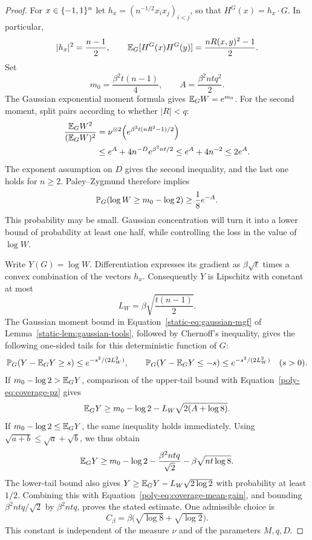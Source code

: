 \begin{proof}
For $x\in\{-1,1\}^n$ let $h_x=(n^{-1/2}x_ix_j)_{i<j}$, so that
$H^G(x)=h_x\cdot G$. In particular,
\[
 |h_x|^2=\frac{n-1}{2},\qquad
 \mathbb E_G[H^G(x)H^G(y)]=\frac{nR(x,y)^2-1}{2}.
\]
Set
\[
 m_0=\frac{\beta^2t(n-1)}4,\qquad
 A=\frac{\beta^2ntq^2}{2}.
\]
The Gaussian exponential moment formula gives $\mathbb E_GW=e^{m_0}$.
For the second moment, split pairs according to whether $|R|<q$:
\begin{align}
 \frac{\mathbb E_GW^2}{(\mathbb E_GW)^2}
 &=\nu^{\otimes2}\!\left(e^{\beta^2t(nR^2-1)/2}\right)\notag\\
 &\le e^A+4n^{-D}e^{\beta^2nt/2}
 \le e^A+4n^{-2}
 \le2e^A.
 \label{poly-eq:coverage-moments}
\end{align}
The exponent assumption on $D$ gives the second inequality, and the last
one holds for $n\ge2$. Paley--Zygmund therefore implies
\begin{equation}\label{poly-eq:coverage-pz}
 \mathbb P_G(\log W\ge m_0-\log2)\ge\frac18e^{-A}.
\end{equation}
This probability may be small. Gaussian concentration will turn it into
a lower bound of probability at least one half, while controlling the loss
in the value of $\log W$.

Write $Y(G)=\log W$. Differentiation expresses its gradient as
$\beta\sqrt t$ times a convex combination of the vectors $h_x$.
Consequently $Y$ is Lipschitz with constant at most
\[
 L_W=\beta\sqrt{\frac{t(n-1)}2}.
\]
The Gaussian moment bound in Equation~\eqref{static-eq:gaussian-mgf}
of Lemma~\ref{static-lem:gaussian-tools}, followed by Chernoff's inequality,
gives the following one-sided tails for this deterministic function of $G$:
\[
 \mathbb P_G(Y-\mathbb E_GY\ge s)\le e^{-s^2/(2L_W^2)},\qquad
 \mathbb P_G(Y-\mathbb E_GY\le-s)\le e^{-s^2/(2L_W^2)}
 \quad(s>0).
\]
If $m_0-\log2>\mathbb E_GY$, comparison of the upper-tail bound with
Equation~\eqref{poly-eq:coverage-pz} gives
\[
 \mathbb E_GY\ge m_0-\log2-L_W\sqrt{2(A+\log8)}.
\]
If $m_0-\log2\le\mathbb E_GY$, the same inequality holds immediately.
Using $\sqrt{a+b}\le\sqrt a+\sqrt b$, we thus obtain
\begin{equation}\label{poly-eq:coverage-mean-gain}
 \mathbb E_GY\ge m_0-\log2
        -\frac{\beta^2ntq}{\sqrt2}
        -\beta\sqrt{nt\log8}.
\end{equation}
The lower-tail bound also gives
$Y\ge\mathbb E_GY-L_W\sqrt{2\log2}$ with probability at least $1/2$.
Combining this with Equation~\eqref{poly-eq:coverage-mean-gain}, and
bounding $\beta^2ntq/\sqrt2$ by $\beta^2ntq$, proves the stated estimate.
One admissible choice is
\[
 C_\beta=\beta\bigl(\sqrt{\log8}+\sqrt{\log2}\bigr).
\]
This constant is independent of the measure $\nu$ and of the parameters
$M,q,D$.
\end{proof}

